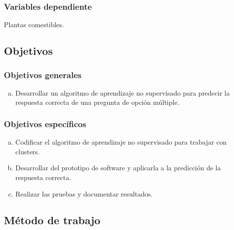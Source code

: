 \documentclass[a4paper, 12pt]{article}
\begin{document}
\subsubsection{Variables dependiente}
Plantas comestibles.
\vskip 0.3cm


\subsection{Objetivos}

\subsubsection{Objetivos generales}

\begin{enumerate}[a)]%
	\item Desarrollar un algoritmo de aprendizaje no supervisado para predecir la respuesta correcta de una pregunta de opción múltiple.
\end{enumerate}


\subsubsection{Objetivos específicos}
\begin{enumerate}[a)]
\item Codificar el algoritmo de aprendizaje no supervisado para trabajar con clusters.
\item Desarrollar del prototipo de software y aplicarla a la predicción de la respuesta correcta.
\item Realizar las pruebas y documentar resultados.
\end{enumerate}



\subsection{Método de trabajo}
\end{document}
